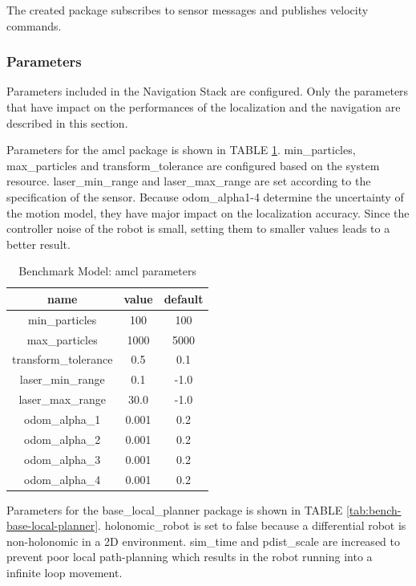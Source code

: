 \documentclass[10pt,journal,compsoc]{IEEEtran}
\begin{document}
The created package subscribes to sensor messages and publishes velocity commands.

\subsubsection{Parameters}
Parameters included in the Navigation Stack are configured. Only the parameters that have impact on the performances of the localization and the navigation are described in this section.

Parameters for the amcl package is shown in TABLE \ref{tab:bench-amcl}. min\_particles, max\_particles and transform\_tolerance are configured based on the system resource. laser\_min\_range and laser\_max\_range are set according to the specification of the sensor. Because odom\_alpha{1-4} determine the uncertainty of the motion model, they have major impact on the localization accuracy. Since the controller noise of the robot is small, setting them to smaller values leads to a better result.

\begin{table}[h]
\caption{Benchmark Model: amcl parameters}
\label{tab:bench-amcl}
\begin{center}
\begin{tabular}{|c|c|c|}
\hline
name & value & default \\
\hline
\hline
min\_particles & 100 & 100 \\
\hline
max\_particles & 1000 & 5000 \\
\hline
transform\_tolerance & 0.5 & 0.1\\
\hline
laser\_min\_range & 0.1 & -1.0\\
\hline
laser\_max\_range & 30.0 & -1.0\\
\hline
odom\_alpha\_1 & 0.001 & 0.2\\
\hline
odom\_alpha\_2 & 0.001 & 0.2\\
\hline
odom\_alpha\_3 & 0.001 & 0.2\\
\hline
odom\_alpha\_4 & 0.001 & 0.2\\
\hline
\end{tabular}
\end{center}
\end{table}

Parameters for the base\_local\_planner package is shown in TABLE \ref{tab:bench-base-local-planner}. holonomic\_robot is set to false because a differential robot is non-holonomic in a 2D environment. sim\_time and pdist\_scale are increased to prevent poor local path-planning which results in the robot running into a infinite loop movement.
\end{document}
